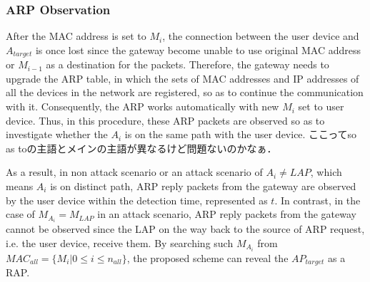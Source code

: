 \documentclass[conference]{IEEEtran}
\begin{document}
\subsubsection{ARP Observation}
After the MAC address is set to $M_i$, the connection between the user device and $A_{target}$ is once lost since the gateway become unable to use original MAC address or $M_{i-1}$ as a destination for the packets.
Therefore, the gateway needs to upgrade the ARP table, in which the sets of MAC addresses and IP addresses of all the devices in the network are registered, so as to continue the communication with it.
Consequently, the ARP works automatically with new $M_i$ set to user device.
Thus, in this procedure, these ARP packets are observed so as to investigate whether the $A_i$ is on the same path with the user device. ここってso as toの主語とメインの主語が異なるけど問題ないのかなぁ．

As a result, in non attack scenario or an attack scenario of $A_i\ne LAP$, which means $A_i$ is on distinct path, ARP reply packets from the gateway are observed by the user device within the detection time, represented as $t$.
In contrast, in the case of $M_{A_i}=M_{LAP}$ in an attack scenario, ARP reply packets from the gateway cannot be observed since the LAP on the way back to the source of ARP request, i.e. the user device, receive them.
By searching such $M_{A_i}$ from $MAC_{all} = \{M_i|0\le i \le n_{all}\}$, the proposed scheme can reveal the $AP_{target}$ as a RAP.
\end{document}
